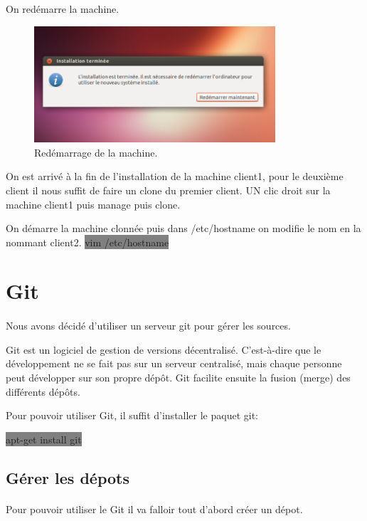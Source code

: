 \documentclass[11pt,a4paper,titlepage, oneside]{article}
\begin{document}
		\newpage
		On redémarre la machine.

	\begin{figure}[h]
                        \centering
                        \includegraphics[width=0.8\textwidth,natwidth=610,natheight=642]{images/demarrerISO7.png}
                        \caption{Redémarrage de la machine.}
                \end{figure}
	
		On est arrivé à la fin de l'installation de la machine client1, pour le deuxième client il nous suffit de faire un clone du premier client. UN clic droit sur la machine client1 puis manage puis clone.

	On démarre la machine clonnée puis dans /etc/hostname on modifie le nom en la nommant client2.
		\colorbox{gray}{vim /etc/hostname}

	
\newpage
\section{{\color{red} Git}}
	\paragraph{}
		Nous avons décidé d'utiliser un serveur git pour gérer les sources.
		
		Git est un logiciel de gestion de versions décentralisé. C'est-à-dire que le développement ne se fait pas sur un serveur centralisé, mais chaque personne peut développer sur son propre dépôt. Git facilite ensuite la fusion (merge) des différents dépôts.

		Pour pouvoir utiliser Git, il suffit d'installer le paquet git:
	
		\colorbox{gray} {apt-get install git}

	\subsection{{\color{red} Gérer les dépots}}
		\paragraph{}
			Pour pouvoir utiliser le Git il va falloir tout d'abord créer un dépot.
			
\end{document}
